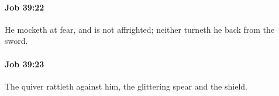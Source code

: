 		\paragraph{Job 39:22} %
			\label{JOB-39-22}

			He mocketh at fear, and is not affrighted; neither turneth he back from the sword.


		\paragraph{Job 39:23} %
			\label{JOB-39-23}

			The quiver rattleth against him, the glittering spear and the shield.


